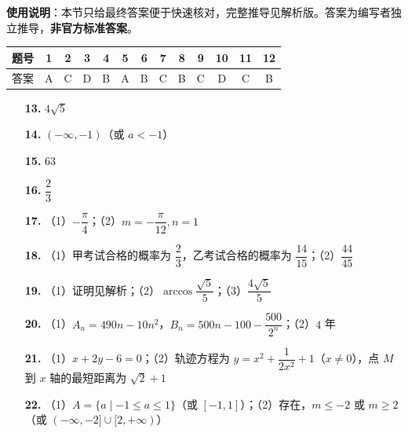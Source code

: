 
\begin{gknotice}
\textbf{使用说明}：本节只给最终答案便于快速核对，完整推导见解析版。答案为编写者独立推导，\textbf{非官方标准答案}。
\end{gknotice}

\begin{center}\begin{tabular}{ccccccccccccc}
\toprule
题号 & 1 & 2 & 3 & 4 & 5 & 6 & 7 & 8 & 9 & 10 & 11 & 12 \\
\midrule
答案 & A & C & D & B & A & B & C & B & C & D & C & B \\
\bottomrule
\end{tabular}\end{center}

\begin{itemize}[leftmargin=2.6em]
  \item[\textbf{13.}] $4\sqrt{5}$
  \item[\textbf{14.}] $(-\infty, -1)$（或 $a < -1$）
  \item[\textbf{15.}] $63$
  \item[\textbf{16.}] $\dfrac{2}{3}$
\end{itemize}

\begin{itemize}[leftmargin=2.6em]
  \item[\textbf{17.}] （1）$-\dfrac{\pi}{4}$；（2）$m = -\dfrac{\pi}{12}, n = 1$
  \item[\textbf{18.}] （1）甲考试合格的概率为 $\dfrac{2}{3}$，乙考试合格的概率为 $\dfrac{14}{15}$；（2）$\dfrac{44}{45}$
  \item[\textbf{19.}] （1）证明见解析；（2）$\arccos\dfrac{\sqrt{5}}{5}$；（3）$\dfrac{4\sqrt{5}}{5}$
  \item[\textbf{20.}] （1）$A_n = 490n - 10n^2$，$B_n = 500n - 100 - \dfrac{500}{2^n}$；（2）$4$ 年
  \item[\textbf{21.}] （1）$x + 2y - 6 = 0$；（2）轨迹方程为 $y = x^2 + \dfrac{1}{2x^2} + 1$（$x \neq 0$），点 $M$ 到 $x$ 轴的最短距离为 $\sqrt{2} + 1$
  \item[\textbf{22.}] （1）$A = \{a \mid -1 \leqslant a \leqslant 1\}$（或 $[-1, 1]$）；（2）存在，$m \leqslant -2$ 或 $m \geqslant 2$（或 $(-\infty, -2] \cup [2, +\infty)$）
\end{itemize}
